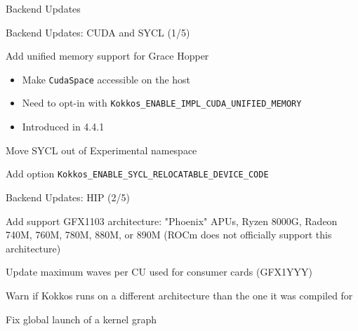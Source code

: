 
\begin{frame}[fragile]

  {\Huge Backend Updates}

  \vspace{10pt}

\end{frame}


\begin{frame}[fragile]{Backend Updates: CUDA and SYCL (1/5)}
   \begin{description}[CUDA]
     \item[CUDA] Add unified memory support for Grace Hopper
       \begin{itemize}
           \item Make \texttt{CudaSpace} accessible on the host
         \item Need to opt-in with \texttt{Kokkos\_ENABLE\_IMPL\_CUDA\_UNIFIED\_MEMORY}
         \item Introduced in 4.4.1
       \end{itemize}
     \item[SYCL] Move SYCL out of Experimental namespace
     \item[SYCL] Add option \texttt{Kokkos\_ENABLE\_SYCL\_RELOCATABLE\_DEVICE\_CODE}
   \end{description}
\end{frame}

\begin{frame}[fragile]{Backend Updates: HIP (2/5)}
  \begin{description}[HIP]
    \item[HIP] Add support GFX1103 architecture: "Phoenix" APUs, Ryzen 8000G, Radeon
      740M, 760M, 780M, 880M, or 890M (ROCm does not officially support this
      architecture)
    \item[HIP] Update maximum waves per CU used for consumer cards (GFX1YYY)
    \item[HIP] Warn if Kokkos runs on a different architecture than the one it was
      compiled for
    \item[HIP] Fix global launch of a kernel graph
  \end{description}
\end{frame}

